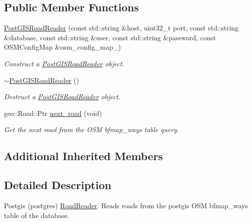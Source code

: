 \subsection*{Public Member Functions}
\begin{DoxyCompactItemize}
\item 
\hyperlink{classgeo__data_1_1PostGISRoadReader_ad45dbce658a641c26137fc04eb2b34e2}{Post\+G\+I\+S\+Road\+Reader} (const std\+::string \&host, uint32\+\_\+t port, const std\+::string \&database, const std\+::string \&user, const std\+::string \&password, const O\+S\+M\+Config\+Map \&osm\+\_\+config\+\_\+map\+\_\+)
\begin{DoxyCompactList}\small\item\em Construct a \hyperlink{classgeo__data_1_1PostGISRoadReader}{Post\+G\+I\+S\+Road\+Reader} object. \end{DoxyCompactList}\item 
\hyperlink{classgeo__data_1_1PostGISRoadReader_aaa5ee860cdc35c2fbc988520859efcbd}{$\sim$\+Post\+G\+I\+S\+Road\+Reader} ()\hypertarget{classgeo__data_1_1PostGISRoadReader_aaa5ee860cdc35c2fbc988520859efcbd}{}\label{classgeo__data_1_1PostGISRoadReader_aaa5ee860cdc35c2fbc988520859efcbd}

\begin{DoxyCompactList}\small\item\em Destruct a \hyperlink{classgeo__data_1_1PostGISRoadReader}{Post\+G\+I\+S\+Road\+Reader} object. \end{DoxyCompactList}\item 
geo\+::\+Road\+::\+Ptr \hyperlink{classgeo__data_1_1PostGISRoadReader_aafd2e9afed093d19550677e91f4cfec2}{next\+\_\+road} (void)
\begin{DoxyCompactList}\small\item\em Get the next road from the O\+SM bfmap\+\_\+ways table query. \end{DoxyCompactList}\end{DoxyCompactItemize}
\subsection*{Additional Inherited Members}


\subsection{Detailed Description}
Postgis (postgres) \hyperlink{classgeo__data_1_1RoadReader}{Road\+Reader}. Reads roads from the postgis O\+SM bfmap\+\_\+ways table of the database. 

